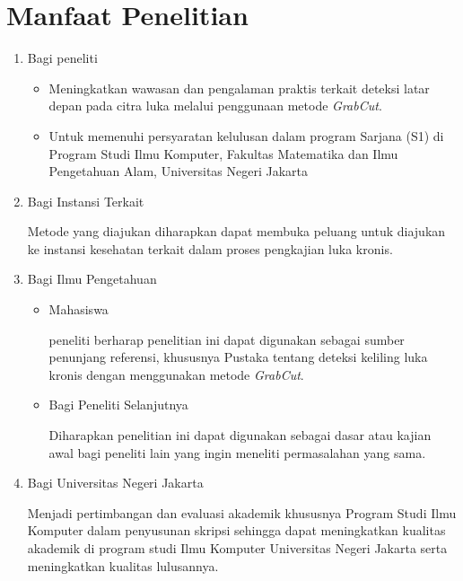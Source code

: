 \section{Manfaat Penelitian}
\begin{enumerate}
	\item Bagi peneliti
	\begin{itemize}
		\item Meningkatkan wawasan dan pengalaman praktis terkait deteksi latar 
		depan pada citra luka melalui penggunaan metode \emph{GrabCut}.

		\item Untuk memenuhi persyaratan kelulusan dalam program Sarjana (S1) di 
		Program Studi Ilmu Komputer, Fakultas Matematika dan Ilmu Pengetahuan Alam, 
		Universitas Negeri Jakarta
	\end{itemize}
		
	\item Bagi Instansi Terkait
	
	Metode yang diajukan diharapkan dapat membuka peluang untuk diajukan ke instansi 
	kesehatan terkait dalam proses pengkajian luka kronis.

	\item Bagi Ilmu Pengetahuan

	\begin{itemize}
		\item Mahasiswa
		
		peneliti berharap penelitian ini dapat digunakan sebagai sumber penunjang 
		referensi, khususnya Pustaka tentang deteksi keliling luka kronis dengan 
		menggunakan metode \emph{GrabCut}.

		\item Bagi Peneliti Selanjutnya
	
		Diharapkan penelitian ini dapat digunakan sebagai dasar atau kajian awal 
		bagi peneliti lain yang ingin meneliti permasalahan yang sama.
	\end{itemize}

	\item Bagi Universitas Negeri Jakarta
	
	Menjadi pertimbangan dan evaluasi akademik khususnya Program Studi Ilmu Komputer 
	dalam penyusunan skripsi sehingga dapat meningkatkan kualitas akademik di program 
	studi Ilmu Komputer Universitas Negeri Jakarta serta meningkatkan kualitas lulusannya.
			
\end{enumerate}

\begin{comment}

\end{comment}